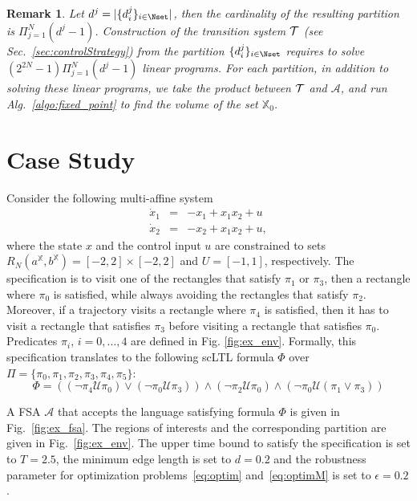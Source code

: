 \documentclass{ifacconf}
\newtheorem{remark}{Remark}
\newcommand{\RNset}{R_N(a^{\mathbb{X}},b^{\mathbb{X}})}
\newcommand{\TS}{{\cal T}}
\newcommand{\XO}{\ensuremath{\mathbb{X}_0}}
\newcommand{\AUTOMATON}{\ensuremath{\mathcal{A}}}
\newcommand{\LTLUNTIL}{\ensuremath{\mathcal{U}}}
\newcommand{\PREDSET}{\ensuremath{\Pi}}
\newcommand{\TIMEBOUND}{\ensuremath{T}}
\begin{document}
\begin{remark} Let $d^j = | \{d^j_i\}_{i \in \Nset}|$, then the cardinality of the resulting partition is $\Pi_{j=1}^N (d^j - 1)$.
Construction of the transition system $\TS$ (see Sec.~\ref{sec:controlStrategy}) from the partition $\{d^j_i\}_{i \in \Nset}$ requires to solve $(2^{2N} - 1)\Pi_{j=1}^N (d^j - 1)$ linear programs. For each partition, in addition to solving these linear programs, we take the product between $\TS$ and $\AUTOMATON$, and run Alg.~\ref{algo:fixed_point} to find the volume of the set $\XO$.
\end{remark}

\section{Case Study}\label{sec:casestudy}

Consider the following multi-affine system
\begin{equation}\label{eq:case_system}
\begin{array}{ccc}
	\dot x_1 & = & -x_1 + x_1x_2 + u \\
	\dot x_2 & = & -x_2 + x_1x_2 + u,	 
\end{array}
\end{equation}
where the state $x$ and the control input $u$ are constrained to sets 
$\RNset = [-2,2] \times [-2,2]$ and $U = [-1,1]$, respectively.
The specification is to visit one of the rectangles that satisfy $\pi_1$ or $\pi_3$, then a rectangle where $\pi_0$ is satisfied, while always avoiding the rectangles that satisfy $\pi_2$. Moreover, if a trajectory visits a rectangle where $\pi_4$ is satisfied, then it has to visit a rectangle that satisfies $\pi_3$ before visiting a rectangle that satisfies $\pi_0$. Predicates $\pi_i$, $i=0,\ldots,4$ are defined in Fig. \ref{fig:ex_env}. Formally, this specification translates to the following scLTL formula $\Phi$ over $\PREDSET = \{\pi_0,\pi_1,\pi_2,\pi_3, \pi_4, \pi_5\}$: 
\begin{equation}\label{eq:spec_case_study}
	\Phi = ( ( \neg \pi_4 \LTLUNTIL \pi_0 ) \vee ( \neg \pi_0 \LTLUNTIL \pi_3) ) \wedge ( \neg \pi_2 \LTLUNTIL \pi_0 ) \wedge ( \neg \pi_0 \LTLUNTIL ( \pi_1 \vee \pi_3 ) )
\end{equation}

A FSA $\AUTOMATON$ that accepts the language satisfying formula $\Phi$ is given in Fig.~\ref{fig:ex_fsa}. The regions of interests and the corresponding partition are given in Fig.~\ref{fig:ex_env}. The upper time bound to satisfy the specification is set to $\TIMEBOUND=2.5$, the minimum edge length is set to $d=0.2$ and the robustness parameter for optimization problems~\eqref{eq:optim} and~\eqref{eq:optimM} is set to $\epsilon=0.2$.
\end{document}
